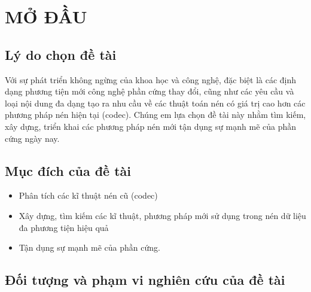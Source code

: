

\chapter*{MỞ ĐẦU}
\label{part: dimred}

\section{Lý do chọn đề tài}

Với sự phát triển không ngừng của khoa học và công nghệ, đặc biệt là các định dạng phương tiện mới
công nghệ phần cứng thay đổi, cũng như các yêu cầu và loại nội dung đa dạng tạo ra nhu cầu
về các thuật toán nén có giá trị cao hơn các phương pháp nén hiện tại (codec). Chúng em lựa chọn
đề tài này nhằm tìm kiếm, xây dựng, triển khai các phương pháp nén mới tận dụng sự mạnh mẽ
của phần cứng ngày nay.


\section{Mục đích của đề tài}

\begin{itemize}
      \item Phân tích các kĩ thuật nén cũ (codec)
      \item Xây dựng, tìm kiếm các kĩ thuật, phương pháp mới sử dụng trong nén dữ liệu
            đa phương tiện hiệu quả
      \item Tận dụng sự mạnh mẽ của phần cứng.
\end{itemize}

\section{Đối tượng và phạm vi nghiên cứu của đề tài}
